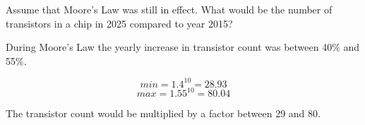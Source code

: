 \begin{acexercise}\end{acexercise}

Assume that Moore's Law was still in effect.
What would be the number of transistors in a chip in 2025 compared to year 2015?

\begin{acsolution}\end{acsolution}

During Moore's Law the yearly increase in transistor count was between 40\% and 55\%.

\[min = 1.4^{10} = 28.93\]
\[max = 1.55^{10} = 80.04\]

The transistor count would be multiplied by a factor between 29 and 80.
